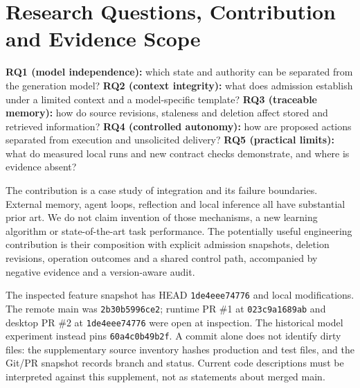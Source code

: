 \documentclass[11pt,a4paper]{article}
\begin{document}
\section{Research Questions, Contribution and Evidence Scope}\label{sec:rq}
\textbf{RQ1 (model independence):} which state and authority can be separated from the generation model? \textbf{RQ2 (context integrity):} what does admission establish under a limited context and a model-specific template? \textbf{RQ3 (traceable memory):} how do source revisions, staleness and deletion affect stored and retrieved information? \textbf{RQ4 (controlled autonomy):} how are proposed actions separated from execution and unsolicited delivery? \textbf{RQ5 (practical limits):} what do measured local runs and new contract checks demonstrate, and where is evidence absent?

The contribution is a case study of integration and its failure boundaries. External memory, agent loops, reflection and local inference all have substantial prior art. We do not claim invention of those mechanisms, a new learning algorithm or state-of-the-art task performance. The potentially useful engineering contribution is their composition with explicit admission snapshots, deletion revisions, operation outcomes and a shared control path, accompanied by negative evidence and a version-aware audit.

The inspected feature snapshot has HEAD \texttt{1de4eee74776} and local modifications. The remote main was \texttt{2b30b5996ce2}; runtime PR \#1 at \texttt{023c9a1689ab} and desktop PR \#2 at \texttt{1de4eee74776} were open at inspection. The historical model experiment instead pins \texttt{60a4c0b49b2f}. A commit alone does not identify dirty files: the supplementary source inventory hashes production and test files, and the Git/PR snapshot records branch and status. Current code descriptions must be interpreted against this supplement, not as statements about merged main.
\end{document}
